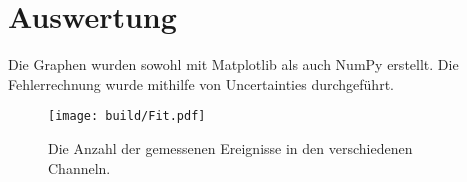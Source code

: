 \section{Auswertung}
\label{sec:Auswertung}


Die Graphen wurden sowohl mit Matplotlib \cite{matplotlib} als auch NumPy \cite{numpy} erstellt. Die
Fehlerrechnung wurde mithilfe von Uncertainties \cite{uncertainties} durchgeführt.

\begin{figure}
	\centering
	\texttt{[image: build/Fit.pdf]}
	\caption{Die Anzahl der gemessenen Ereignisse in den verschiedenen Channeln.}
	\label{fig:erste}
\end{figure}


